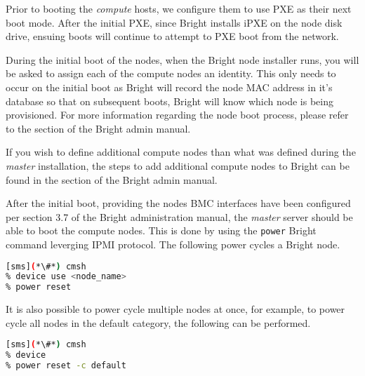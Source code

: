 Prior to booting the {\em compute} hosts, we configure them to use PXE as their
next boot mode. After the initial PXE, since Bright installs iPXE on the node 
disk drive, ensuing boots will continue to attempt to PXE boot from the network.

During the initial boot of the nodes, when the Bright node installer runs,
you will be asked to assign each of the compute nodes an identity. This only
needs to occur on the initial boot as Bright will record the node MAC address
in it's database so that on subsequent boots, Bright will know which node is
being provisioned. For more information regarding the node boot process,
please refer to the
\href{https://support.brightcomputing.com/manuals/9.0/admin-manual.pdf#section.5.4}{\color{blue}{Node-Installer}}
section of the Bright admin manual.

If you wish to define additional compute nodes than what was defined during
the {\em master} installation, the steps to add additional compute nodes to Bright
can be found in the
\href{https://support.brightcomputing.com/manuals/9.0/admin-manual.pdf#section.5.7}{\color{blue}{Adding New Nodes}}
section of the Bright admin manual.

After the initial boot, providing the nodes BMC interfaces have been configured 
per section 3.7 of the Bright administration manual, the {\em master} server 
should be able to boot the compute nodes. This is done by using the \texttt{power} 
Bright command leverging IPMI protocol. The following power cycles a Bright
node.

\begin{lstlisting}[language=bash,keywords={},upquote=true]
[sms](*\#*) cmsh
% device use <node_name>
% power reset
\end{lstlisting} 

It is also possible to power cycle multiple nodes at once, for example,
to power cycle all nodes in the default category, the following can be performed.

\begin{lstlisting}[language=bash,keywords={},upquote=true]
[sms](*\#*) cmsh
% device
% power reset -c default
\end{lstlisting} 

